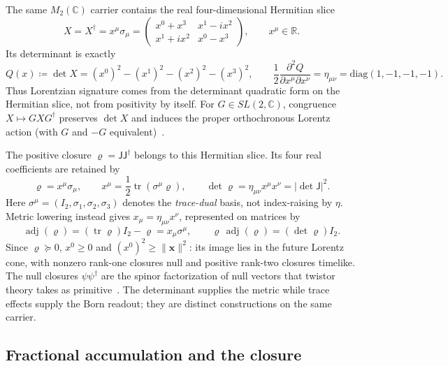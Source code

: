 \documentclass[10pt]{article}
\newcommand{\sJ}{\mathsf{J}}
\newcommand{\tr}{\operatorname{tr}}
\newcommand{\adj}{\operatorname{adj}}
\begin{document}
The same $M_2(\mathbb C)$ carrier contains the real four-dimensional Hermitian slice
\begin{equation}
X=X^\dagger=x^\mu\sigma_\mu=\begin{pmatrix}x^0+x^3&x^1-ix^2\\x^1+ix^2&x^0-x^3\end{pmatrix},\qquad x^\mu\in\mathbb R.\label{e:16}
\end{equation}
Its determinant is exactly
\begin{equation}
Q(x)\coloneqq\det X=(x^0)^2-(x^1)^2-(x^2)^2-(x^3)^2,\qquad \frac12\frac{\partial^2Q}{\partial x^\mu\partial x^\nu}=\eta_{\mu\nu}=\mathrm{diag}(1,-1,-1,-1).\label{e:17}
\end{equation}
Thus Lorentzian signature comes from the determinant quadratic form on the Hermitian slice, not from positivity by itself. For $G\in SL(2,\mathbb C)$, congruence $X\mapsto GXG^\dagger$ preserves $\det X$ and induces the proper orthochronous Lorentz action (with $G$ and $-G$ equivalent)~\cite{baylis,penrose}.

The positive closure $\varrho=\sJ\sJ^\dagger$ belongs to this Hermitian slice. Its four real coefficients are retained by
\begin{equation}
\varrho=x^\mu\sigma_\mu,\qquad x^\mu=\frac12\tr(\sigma^\mu\varrho),\qquad \det\varrho=\eta_{\mu\nu}x^\mu x^\nu=|\det\sJ|^2.\label{e:18}
\end{equation}
Here $\sigma^\mu=(I_2,\sigma_1,\sigma_2,\sigma_3)$ denotes the \emph{trace-dual} basis, not index-raising by $\eta$. Metric lowering instead gives $x_\mu=\eta_{\mu\nu}x^\nu$, represented on matrices by
\begin{equation}
\adj(\varrho)=(\tr\varrho)I_2-\varrho=x_\mu\sigma^\mu,\qquad \varrho\,\adj(\varrho)=(\det\varrho)I_2.\label{e:19}
\end{equation}
Since $\varrho\succeq0$, $x^0\ge0$ and $(x^0)^2\ge\|\boldsymbol x\|^2$: its image lies in the future Lorentz cone, with nonzero rank-one closures null and positive rank-two closures timelike. The null closures $\psi\psi^\dagger$ are the spinor factorization of null vectors that twistor theory takes as primitive~\cite{penrosetwistor}. The determinant supplies the metric while trace effects supply the Born readout; they are distinct constructions on the same carrier.

\subsection*{Fractional accumulation and the closure}
\end{document}
